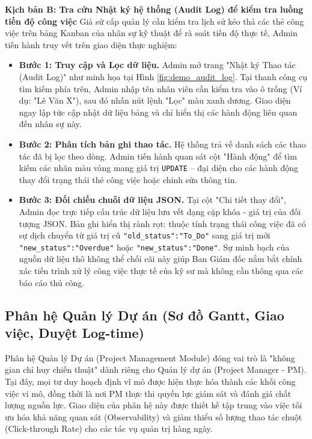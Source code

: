 \documentclass[a4paper,13.5pt]{extreport}
\begin{document}
\textbf{Kịch bản B: Tra cứu Nhật ký hệ thống (Audit Log) để kiểm tra luồng tiến độ công việc}
Giả sử cấp quản lý cần kiểm tra lịch sử kéo thả các thẻ công việc trên bảng Kanban của nhân sự kỹ thuật để rà soát tiến độ thực tế, Admin tiến hành truy vết trên giao diện thực nghiệm:
\begin{itemize}
    \item \textbf{Bước 1: Truy cập và Lọc dữ liệu.} Admin mở trang "Nhật ký Thao tác (Audit Log)" như minh họa tại Hình \ref{fig:demo_audit_log}. Tại thanh công cụ tìm kiếm phía trên, Admin nhập tên nhân viên cần kiểm tra vào ô trống (Ví dụ: "Lê Văn X"), sau đó nhấn nút lệnh "Lọc" màu xanh dương. Giao diện ngay lập tức cập nhật dữ liệu bảng và chỉ hiển thị các hành động liên quan đến nhân sự này.
    \item \textbf{Bước 2: Phân tích bản ghi thao tác.} Hệ thống trả về danh sách các thao tác đã bị lọc theo dòng. Admin tiến hành quan sát cột "Hành động" để tìm kiếm các nhãn màu vàng mang giá trị \texttt{UPDATE} – đại diện cho các hành động thay đổi trạng thái thẻ công việc hoặc chỉnh sửa thông tin.
    \item \textbf{Bước 3: Đối chiếu chuỗi dữ liệu JSON.} Tại cột "Chi tiết thay đổi", Admin đọc trực tiếp cấu trúc dữ liệu lưu vết dạng cặp khóa - giá trị của đối tượng JSON. Bản ghi hiển thị rành rọt: thuộc tính trạng thái công việc đã có sự dịch chuyển từ giá trị cũ \texttt{"old\_status":"To\_Do"} sang giá trị mới \texttt{"new\_status":"Overdue"} hoặc \texttt{"new\_status":"Done"}. Sự minh bạch của nguồn dữ liệu thô không thể chối cãi này giúp Ban Giám đốc nắm bắt chính xác tiến trình xử lý công việc thực tế của kỹ sư mà không cần thông qua các báo cáo thủ công.
\end{itemize}

\subsection{Phân hệ Quản lý Dự án (Sơ đồ Gantt, Giao việc, Duyệt Log-time)}

Phân hệ Quản lý Dự án (Project Management Module) đóng vai trò là "không gian chỉ huy chiến thuật" dành riêng cho Quản lý dự án (Project Manager - PM). Tại đây, mọi tư duy hoạch định vĩ mô được hiện thực hóa thành các khối công việc vi mô, đồng thời là nơi PM thực thi quyền lực giám sát và đánh giá chất lượng nguồn lực. Giao diện của phân hệ này được thiết kế tập trung vào việc tối ưu hóa khả năng quan sát (Observability) và giảm thiểu số lượng thao tác chuột (Click-through Rate) cho các tác vụ quản trị hàng ngày.
\end{document}
